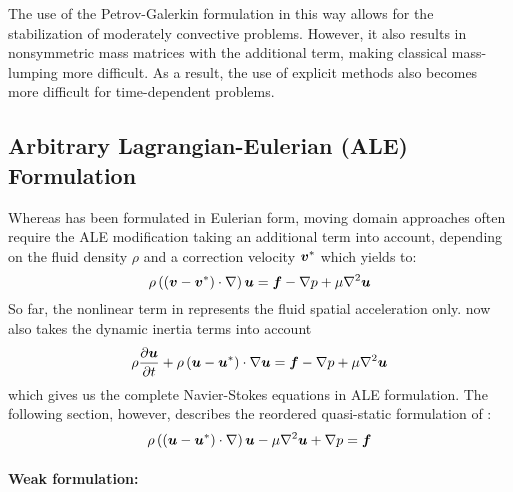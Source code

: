 The use of the Petrov-Galerkin formulation in this way allows for the
stabilization of moderately convective problems. However, it also results in
nonsymmetric mass matrices with the additional term, making classical
mass-lumping more difficult. As a result, the use of explicit methods also
becomes more difficult for time-dependent problems.


\subsection{Arbitrary Lagrangian-Eulerian (ALE) Formulation}
Whereas  has been formulated in Eulerian
form, moving domain approaches often require the ALE modification taking an
additional term into account, depending on the fluid density $\rho$ and a
correction velocity $ \boldsymbol{v} ^{*}$ which yields to:
\begin{equation}
  \rho\pbrac{\dotprod{\pbrac{\vectr{v}-\vectr{v}^*}}{\grad}}\vectr{u}=\vectr{f}-\gradient{}{p}+\mu\laplacian{}{\vectr{u}}
  \label{eqn:NavierStokesequationALE}
\end{equation}
So far, the nonlinear term in  represents
the fluid spatial acceleration only.  now
also takes the dynamic inertia terms into account
\begin{equation}
  \rho\delby{\vectr{u}}{t}+ \dotprod{\rho\pbrac{\vectr{u}-\vectr{u}^*}}{\grad}\vectr{u}=\vectr{f}-\gradient{}{p}+\mu\laplacian{}{\vectr{u}}
  \label{eqn:NavierStokesequation2}
\end{equation}
which gives us the complete Navier-Stokes equations in ALE formulation.  The
following section, however, describes the reordered quasi-static formulation
of :
\begin{equation}
  \rho\pbrac{\dotprod{\pbrac{\vectr{u}-\vectr{u}^*}}{\grad}}\vectr{u}-\mu\laplacian{}{\vectr{u}}+\gradient{}{p}=\vectr{f}
  \label{eqn:NavierStokesequationALE2}
\end{equation}

\paragraph{Weak formulation:}


